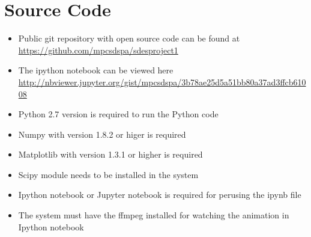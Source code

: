\documentclass[12pt, a4paper]{report}
\begin{document}
\chapter{Source Code}
\begin{itemize}
\item Public git repository with open source code can be found at \url{https://github.com/mpcsdspa/sdesproject1}
\item The ipython notebook can be viewed here \url{http://nbviewer.jupyter.org/gist/mpcsdspa/3b78ae25d5a51bb80a37ad3ffcb61008}
\item Python 2.7 version is required to run the Python code
\item Numpy with version 1.8.2 or higer is required
\item Matplotlib with version 1.3.1 or higher is required
\item Scipy module needs to be installed in the system
\item Ipython notebook or Jupyter notebook is required for perusing the ipynb file
\item The system must have the ffmpeg installed for watching the animation in Ipython notebook
\end{itemize}

%


\end{document}
